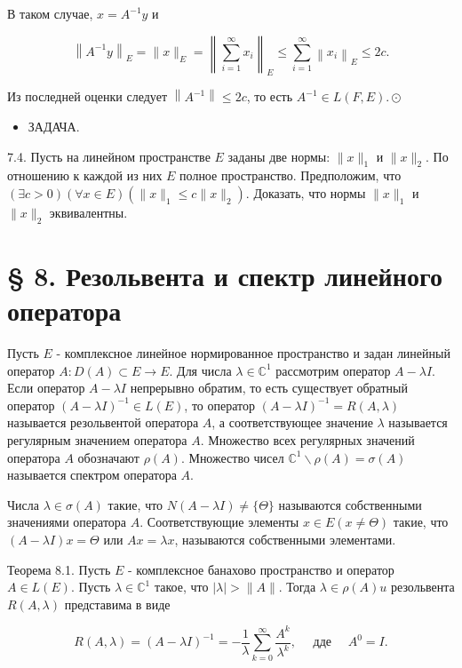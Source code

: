 В таком случае, $x=A^{-1} y$ и

$$
\left\|A^{-1} y\right\|_{E}=\|x\|_{E}=\left\|\sum_{i=1}^{\infty} x_{i}\right\|_{E} \leq \sum_{i=1}^{\infty}\left\|x_{i}\right\|_{E} \leq 2 c .
$$

Из последней оценки следует $\left\|A^{-1}\right\| \leq 2 c$, то есть $A^{-1} \in L(F, E) . \odot$

\begin{itemize}
  \item ЗАДАЧА.
\end{itemize}

7.4. Пусть на линейном пространстве $E$ заданы две нормы: $\|x\|_{1}$ и $\|x\|_{2}$. По отношению к каждой из них $E$ полное пространство. Предположим, что $(\exists c>0)(\forall x \in E)\left(\|x\|_{1} \leq c\|x\|_{2}\right)$. Доказать, что нормы $\|x\|_{1}$ и $\|x\|_{2}$ эквивалентны.

\section*{§ 8. Резольвента и спектр линейного оператора}
Пусть $E$ - комплексное линейное нормированное пространство и задан линейный оператор $A: D(A) \subset E \rightarrow E$. Для числа $\lambda \in \mathbb{C}^{1}$ рассмотрим оператор $A-\lambda I$. Если оператор $A-\lambda I$ непрерывно обратим, то есть существует обратный оператор $(A-\lambda I)^{-1} \in L(E)$, то оператор $(A-\lambda I)^{-1}=R(A, \lambda)$ называется резольвентой оператора $A$, а соответствующее значение $\lambda$ называется регулярным значением оператора $A$. Множество всех регулярных значений оператора $A$ обозначают $\rho(A)$. Множество чисел $\mathbb{C}^{1} \backslash \rho(A)=\sigma(A)$ называется спектром оператора $A$.

Числа $\lambda \in \sigma(A)$ такие, что $N(A-\lambda I) \neq\{\Theta\}$ называются собственными значениями оператора $A$. Соответствующие элементы $x \in E(x \neq \Theta)$ такие, что $(A-\lambda I) x=\Theta$ или $A x=\lambda x$, называются собственными элементами.

Теорема 8.1. Пусть $E$ - комплексное банахово пространство и оператор $A \in L(E)$. Пусть $\lambda \in \mathbb{C}^{1}$ такое, что $|\lambda|>\|A\|$. Тогда $\lambda \in \rho(A) u$ резольвента $R(A, \lambda)$ представима в виде

\[
R(A, \lambda)=(A-\lambda I)^{-1}=-\frac{1}{\lambda} \sum_{k=0}^{\infty} \frac{A^{k}}{\lambda^{k}}, \quad \text { дде } \quad A^{0}=I .
\]

